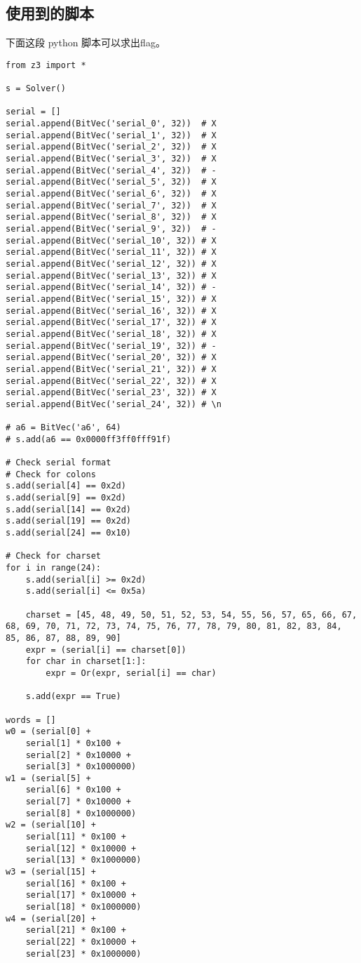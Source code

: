 \documentclass[a4paper,UTF8]{ctexart}
\begin{document}
\subsection{使用到的脚本}

下面这段 python 脚本可以求出flag。

\begin{verbatim}
from z3 import *

s = Solver()

serial = []
serial.append(BitVec('serial_0', 32))  # X
serial.append(BitVec('serial_1', 32))  # X
serial.append(BitVec('serial_2', 32))  # X
serial.append(BitVec('serial_3', 32))  # X
serial.append(BitVec('serial_4', 32))  # -
serial.append(BitVec('serial_5', 32))  # X
serial.append(BitVec('serial_6', 32))  # X
serial.append(BitVec('serial_7', 32))  # X
serial.append(BitVec('serial_8', 32))  # X
serial.append(BitVec('serial_9', 32))  # -
serial.append(BitVec('serial_10', 32)) # X
serial.append(BitVec('serial_11', 32)) # X
serial.append(BitVec('serial_12', 32)) # X
serial.append(BitVec('serial_13', 32)) # X
serial.append(BitVec('serial_14', 32)) # -
serial.append(BitVec('serial_15', 32)) # X
serial.append(BitVec('serial_16', 32)) # X
serial.append(BitVec('serial_17', 32)) # X
serial.append(BitVec('serial_18', 32)) # X
serial.append(BitVec('serial_19', 32)) # -
serial.append(BitVec('serial_20', 32)) # X
serial.append(BitVec('serial_21', 32)) # X
serial.append(BitVec('serial_22', 32)) # X
serial.append(BitVec('serial_23', 32)) # X
serial.append(BitVec('serial_24', 32)) # \n

# a6 = BitVec('a6', 64)
# s.add(a6 == 0x0000ff3ff0fff91f)

# Check serial format
# Check for colons
s.add(serial[4] == 0x2d)
s.add(serial[9] == 0x2d)
s.add(serial[14] == 0x2d)
s.add(serial[19] == 0x2d)
s.add(serial[24] == 0x10)

# Check for charset
for i in range(24):
    s.add(serial[i] >= 0x2d)
    s.add(serial[i] <= 0x5a)

    charset = [45, 48, 49, 50, 51, 52, 53, 54, 55, 56, 57, 65, 66, 67, 68, 69, 70, 71, 72, 73, 74, 75, 76, 77, 78, 79, 80, 81, 82, 83, 84, 85, 86, 87, 88, 89, 90]
    expr = (serial[i] == charset[0])
    for char in charset[1:]:
        expr = Or(expr, serial[i] == char)

    s.add(expr == True)

words = []
w0 = (serial[0] +
    serial[1] * 0x100 +
    serial[2] * 0x10000 +
    serial[3] * 0x1000000)
w1 = (serial[5] +
    serial[6] * 0x100 +
    serial[7] * 0x10000 +
    serial[8] * 0x1000000)
w2 = (serial[10] +
    serial[11] * 0x100 +
    serial[12] * 0x10000 +
    serial[13] * 0x1000000)
w3 = (serial[15] +
    serial[16] * 0x100 +
    serial[17] * 0x10000 +
    serial[18] * 0x1000000)
w4 = (serial[20] +
    serial[21] * 0x100 +
    serial[22] * 0x10000 +
    serial[23] * 0x1000000)


\end{verbatim}
\end{document}
